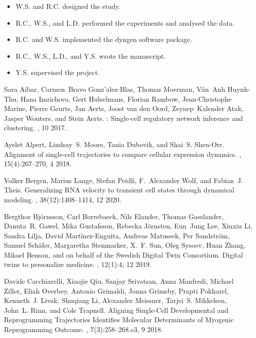 \documentclass[10pt, a4paper]{article}
\begin{document}
\begin{itemize}
\item W.S. and R.C. designed the study.
\item R.C., W.S., and L.D. performed the experiments and analysed the data.
\item R.C. and W.S. implemented the dyngen software package.
\item R.C., W.S., L.D., and Y.S. wrote the manuscript.
\item Y.S. supervised the project.
\end{itemize}


\begin{thebibliography}{10}
	
	Sara Aibar, Carmen~Bravo Gonz{\a'a}lez-Blas, Thomas Moerman, V{\^a}n~Anh
	Huynh-Thu, Hana Imrichova, Gert Hulselmans, Florian Rambow, Jean-Christophe
	Marine, Pierre Geurts, Jan Aerts, Joost {van den Oord}, Zeynep~Kalender Atak,
	Jasper Wouters, and Stein Aerts.
	: Single-cell regulatory network inference and clustering.
	, 10 2017.
	
	Ayelet Alpert, Lindsay~S. Moore, Tania Dubovik, and Shai~S. Shen-Orr.
	\newblock Alignment of single-cell trajectories to compare cellular expression
	dynamics.
	, 15(4):267--270, 4 2018.
	
	Volker Bergen, Marius Lange, Stefan Peidli, F.~Alexander Wolf, and Fabian~J.
	Theis.
	\newblock Generalizing {{RNA}} velocity to transient cell states through
	dynamical modeling.
	, 38(12):1408--1414, 12 2020.
	
	Bergthor Bj{\"o}rnsson, Carl Borrebaeck, Nils Elander, Thomas Gasslander,
	Danuta~R. Gawel, Mika Gustafsson, Rebecka J{\"o}rnsten, Eun~Jung Lee, Xinxiu
	Li, Sandra Lilja, David Mart\'inez-Enguita, Andreas Matussek, Per
	Sandstr{\"o}m, Samuel Sch{\"a}fer, Margaretha Stenmarker, X.~F. Sun, Oleg
	Sysoev, Huan Zhang, Mikael Benson, and {on behalf of the Swedish Digital Twin
		Consortium}.
	\newblock Digital twins to personalize medicine.
	, 12(1):4, 12 2019.
	
	Davide Cacchiarelli, Xiaojie Qiu, Sanjay Srivatsan, Anna Manfredi, Michael
	Ziller, Eliah Overbey, Antonio Grimaldi, Jonna Grimsby, Prapti Pokharel,
	Kenneth~J. Livak, Shuqiang Li, Alexander Meissner, Tarjei~S. Mikkelsen,
	John~L. Rinn, and Cole Trapnell.
	\newblock Aligning {{Single}}-{{Cell Developmental}} and {{Reprogramming
			Trajectories Identifies Molecular Determinants}} of {{Myogenic Reprogramming
			Outcome}}.
	, 7(3):258--268.e3, 9 2018.
	

\end{thebibliography}
\end{document}
